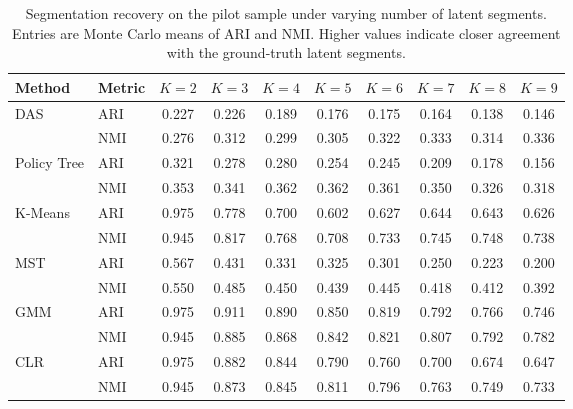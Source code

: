 \begin{table}[htbp]
\centering
\caption{Segmentation recovery on the pilot sample under varying number of latent segments. Entries are Monte Carlo means of ARI and NMI. Higher values indicate closer agreement with the ground-truth latent segments.}
\label{tab:app-ari-nmi-varying-K}
\begin{tabular}{llcccccccc}
\toprule
Method & Metric & $K=2$ & $K=3$ & $K=4$ & $K=5$ & $K=6$ & $K=7$ & $K=8$ & $K=9$ \\
\midrule
DAS & ARI & 0.227 & 0.226 & 0.189 & 0.176 & 0.175 & 0.164 & 0.138 & 0.146 \\
 & NMI & 0.276 & 0.312 & 0.299 & 0.305 & 0.322 & 0.333 & 0.314 & 0.336 \\
\addlinespace
Policy Tree & ARI & 0.321 & 0.278 & 0.280 & 0.254 & 0.245 & 0.209 & 0.178 & 0.156 \\
 & NMI & 0.353 & 0.341 & 0.362 & 0.362 & 0.361 & 0.350 & 0.326 & 0.318 \\
\addlinespace
K-Means & ARI & 0.975 & 0.778 & 0.700 & 0.602 & 0.627 & 0.644 & 0.643 & 0.626 \\
 & NMI & 0.945 & 0.817 & 0.768 & 0.708 & 0.733 & 0.745 & 0.748 & 0.738 \\
\addlinespace
MST & ARI & 0.567 & 0.431 & 0.331 & 0.325 & 0.301 & 0.250 & 0.223 & 0.200 \\
 & NMI & 0.550 & 0.485 & 0.450 & 0.439 & 0.445 & 0.418 & 0.412 & 0.392 \\
\addlinespace
GMM & ARI & 0.975 & 0.911 & 0.890 & 0.850 & 0.819 & 0.792 & 0.766 & 0.746 \\
 & NMI & 0.945 & 0.885 & 0.868 & 0.842 & 0.821 & 0.807 & 0.792 & 0.782 \\
\addlinespace
CLR & ARI & 0.975 & 0.882 & 0.844 & 0.790 & 0.760 & 0.700 & 0.674 & 0.647 \\
 & NMI & 0.945 & 0.873 & 0.845 & 0.811 & 0.796 & 0.763 & 0.749 & 0.733 \\
\bottomrule
\end{tabular}
\end{table}

